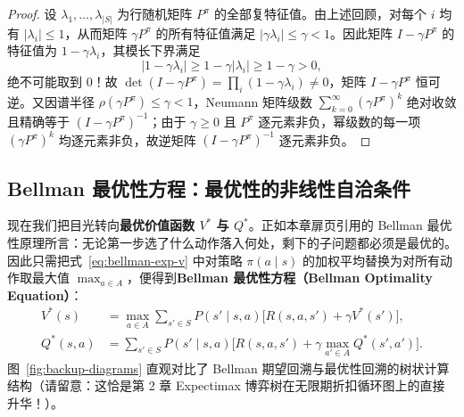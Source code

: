 \begin{proof}
设 $\lambda_1, \dots, \lambda_{|S|}$ 为行随机矩阵 $P^\pi$ 的全部复特征值。由上述回顾，对每个 $i$ 均有 $|\lambda_i| \le 1$，从而矩阵 $\gamma P^\pi$ 的所有特征值满足 $|\gamma \lambda_i| \le \gamma < 1$。因此矩阵 $I - \gamma P^\pi$ 的特征值为 $1 - \gamma \lambda_i$，其模长下界满足
\[
  |1 - \gamma \lambda_i| \ge 1 - \gamma |\lambda_i| \ge 1 - \gamma > 0,
\]
绝不可能取到 $0$！故 $\det(I - \gamma P^\pi) = \prod_i (1 - \gamma \lambda_i) \neq 0$，矩阵 $I - \gamma P^\pi$ 恒可逆。又因谱半径 $\rho(\gamma P^\pi) \le \gamma < 1$，Neumann 矩阵级数 $\sum_{k=0}^\infty (\gamma P^\pi)^k$ 绝对收敛且精确等于 $(I - \gamma P^\pi)^{-1}$；由于 $\gamma \ge 0$ 且 $P^\pi$ 逐元素非负，幂级数的每一项 $(\gamma P^\pi)^k$ 均逐元素非负，故逆矩阵 $(I - \gamma P^\pi)^{-1}$ 逐元素非负。
\end{proof}

\subsection{Bellman 最优性方程：最优性的非线性自洽条件}

现在我们把目光转向\textbf{最优价值函数 $V^*$ 与 $Q^*$}。正如本章扉页引用的 Bellman 最优性原理所言：无论第一步选了什么动作落入何处，剩下的子问题都必须是最优的。因此只需把式~\eqref{eq:bellman-exp-v} 中对策略 $\pi(a\mid s)$ 的加权平均替换为对所有动作取最大值 $\max_{a \in A}$，便得到\textbf{Bellman 最优性方程（Bellman Optimality Equation）}：
\begin{align}
  V^*(s) &= \max_{a \in A} \sum_{s' \in S} P(s' \mid s, a)\Big[R(s, a, s') + \gamma V^*(s')\Big], \label{eq:bellman-opt-v}\\
  Q^*(s, a) &= \sum_{s' \in S} P(s' \mid s, a)\Big[R(s, a, s') + \gamma \max_{a' \in A} Q^*(s', a')\Big]. \label{eq:bellman-opt-q}
\end{align}
图~\ref{fig:backup-diagrams} 直观对比了 Bellman 期望回溯与最优性回溯的树状计算结构（请留意：这恰是第 2 章 Expectimax 博弈树在无限期折扣循环图上的直接升华！）。

